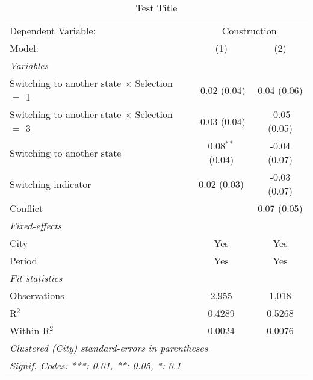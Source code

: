 \begin{table}[htbp]
   \caption{Test Title}
   \centering
   \begin{tabular}{lcc}
      \tabularnewline \midrule \midrule
      Dependent Variable: & \multicolumn{2}{c}{Construction}\\
      Model:                                               & (1)                & (2)\\  
      \midrule
      \emph{Variables}\\
      Switching to another state $\times$ Selection $=$ 1  & -0.02 (0.04)       & 0.04 (0.06)\\   
      Switching to another state $\times$ Selection $=$ 3  & -0.03 (0.04)       & -0.05 (0.05)\\   
      Switching to another state                           & 0.08$^{**}$ (0.04) & -0.04 (0.07)\\   
      Switching indicator                                  & 0.02 (0.03)        & -0.03 (0.07)\\   
      Conflict                                             &                    & 0.07 (0.05)\\   
      \midrule
      \emph{Fixed-effects}\\
      City                                                 & Yes                & Yes\\  
      Period                                               & Yes                & Yes\\  
      \midrule
      \emph{Fit statistics}\\
      Observations                                         & 2,955              & 1,018\\  
      R$^2$                                                & 0.4289             & 0.5268\\  
      Within R$^2$                                         & 0.0024             & 0.0076\\  
      \midrule \midrule
      \multicolumn{3}{l}{\emph{Clustered (City) standard-errors in parentheses}}\\
      \multicolumn{3}{l}{\emph{Signif. Codes: ***: 0.01, **: 0.05, *: 0.1}}\\
   \end{tabular}
\end{table}
